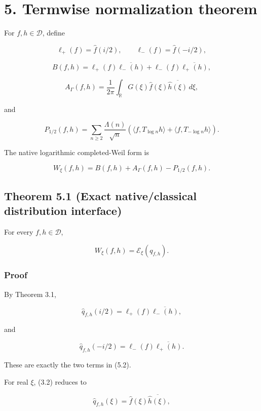\hypertarget{termwise-normalization-theorem}{%
\section{5. Termwise normalization theorem}\label{termwise-normalization-theorem}}

For \(f,h\in\mathcal D\), define

\[
\ell_+(f)=\widehat f(i/2),
\qquad
\ell_-(f)=\widehat f(-i/2),
\tag{5.1}
\]

\[
B(f,h)
=
\ell_+(f)\overline{\ell_-(h)}
+
\ell_-(f)\overline{\ell_+(h)},
\tag{5.2}
\]

\[
A_\Gamma(f,h)
=
\frac1{2\pi}
\int_{\mathbb R}
G(\xi)\widehat f(\xi)
\overline{\widehat h(\xi)}\,d\xi,
\tag{5.3}
\]

and

\[
P_{1/2}(f,h)
=
\sum_{n\ge2}\frac{\Lambda(n)}{\sqrt n}
\left(
\langle f,T_{\log n}h\rangle
+
\langle f,T_{-\log n}h\rangle
\right).
\tag{5.4}
\]

The native logarithmic completed-Weil form is

\[
W_\xi(f,h)=B(f,h)+A_\Gamma(f,h)-P_{1/2}(f,h).
\tag{5.5}
\]

\hypertarget{theorem-5.1-exact-nativeclassical-distribution-interface}{%
\subsection{Theorem 5.1 (Exact native/classical distribution interface)}\label{theorem-5.1-exact-nativeclassical-distribution-interface}}

For every \(f,h\in\mathcal D\),

\[
\boxed{
W_\xi(f,h)=\mathcal E_\xi(q_{f,h}).
}
\tag{5.6}
\]

\hypertarget{proof-1}{%
\subsubsection{Proof}\label{proof-1}}

By Theorem 3.1,

\[
\widehat q_{f,h}(i/2)
=
\ell_+(f)\overline{\ell_-(h)},
\]

and

\[
\widehat q_{f,h}(-i/2)
=
\ell_-(f)\overline{\ell_+(h)}.
\]

These are exactly the two terms in (5.2).

For real \(\xi\), (3.2) reduces to

\[
\widehat q_{f,h}(\xi)
=\widehat f(\xi)\overline{\widehat h(\xi)},
\]

